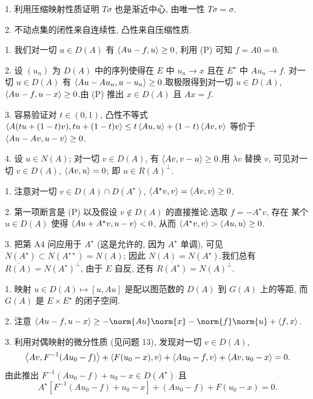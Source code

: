 
1. 利用压缩映射性质证明 $T\sigma$ 也是渐近中心, 由唯一性 $T\sigma=\sigma$.

2. 不动点集的闭性来自连续性, 凸性来自压缩性质.


1. 我们对一切 $u\in D(A)$ 有 $\left\langle Au-f,u\right\rangle\ge0$, 利用 (P) 可知 $f=A0=0$.

2. 设 $(u_n)$ 为 $D(A)$ 中的序列使得在 $E$ 中 $u_n\to x$ 且在 $E^\star$ 中 $Au_n\to f$.
对一切 $u\in D(A)$ 有 $\left\langle Au-Au_n,u-u_n\right\rangle\ge0$.取极限得到对一切 $u\in D(A)$,
$\left\langle Au-f,u-x\right\rangle\ge0$.由 (P) 推出 $x\in D(A)$ 且 $Ax=f$.

3. 容易验证对 $t\in(0,1)$, 凸性不等式
$\left\langle A(tu+(1-t)v),tu+(1-t)v\right\rangle\le t\left\langle Au,u\right\rangle+(1-t)\left\langle Av,v\right\rangle$ 等价于
$\left\langle Au-Av,u-v\right\rangle\ge0$.

4. 设 $u\in N(A)$; 对一切 $v\in D(A)$, 有 $\left\langle Av,v-u\right\rangle\ge0$.用 $\lambda v$ 替换 $v$,
可见对一切 $v\in D(A)$, $\left\langle Av,u\right\rangle=0$; 即 $u\in R(A)^\perp$.


1. 注意对一切 $v\in D(A)\cap D(A^\star)$, $\left\langle A^\star v,v\right\rangle=\left\langle Av,v\right\rangle\ge0$.

2. 第一项断言是 (P) 以及假设 $v\notin D(A)$ 的直接推论.选取 $f=-A^\star v$, 存在
某个 $u\in D(A)$ 使得 $\left\langle Au+A^\star v,u-v\right\rangle<0$, 从而
$\left\langle A^\star v,v\right\rangle>\left\langle Au,u\right\rangle\ge0$.

3. 把第 A4 问应用于 $A^\star$ (这是允许的, 因为 $A^\star$ 单调), 可见
$N(A^\star)\subset N(A^{\star\star})=N(A)$; 因此 $N(A)=N(A^\star)$.我们总有
$\overline{R(A)}=N(A^\star)^\perp$, 由于 $E$ 自反, 还有 $\overline{R(A^\star)}=N(A)^\perp$.


1. 映射 $u\in D(A)\mapsto[u,Au]$ 是配以图范数的 $D(A)$ 到 $G(A)$ 上的等距, 而 $G(A)$
是 $E\times E^\star$ 的闭子空间.

2. 注意 $\dual{Au-f}{u-x}\ge-\norm{Au}\norm{x}-\norm{f}\norm{u}+\dual{f}{x}$.

3. 利用对偶映射的微分性质 (见问题 13), 发现对一切 $v\in D(A)$,
\begin{equation*}
\left\langle Av,F^{-1}(Au_0-f)\right\rangle+\left\langle F(u_0-x),v\right\rangle+\left\langle Au_0-f,v\right\rangle+\left\langle Av,u_0-x\right\rangle=0.
\end{equation*}
由此推出 $F^{-1}(Au_0-f)+u_0-x\in D(A^\star)$ 且
\begin{equation}
A^\star[F^{-1}(Au_0-f)+u_0-x]+(Au_0-f)+F(u_0-x)=0.
\tag{S1}
\label{eq:prob16.S1}
\end{equation}


